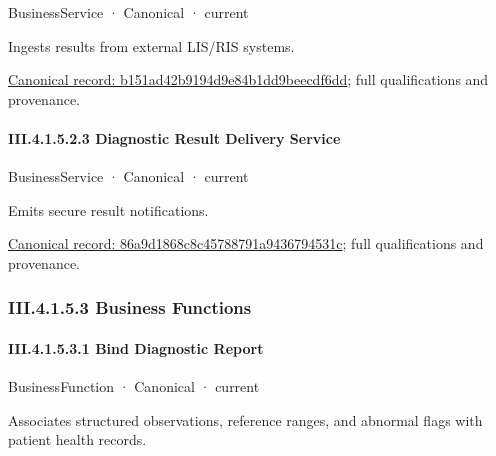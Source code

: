 \label{element:b151ad42b9194d9e84b1dd9beecdf6dd}
{\small BusinessService · Canonical · current}\par

Ingests results from external LIS/RIS systems.


{\footnotesize \href{../../../../continuum/business/business-service/b151ad42b9194d9e84b1dd9beecdf6dd.md}{Canonical record: b151ad42b9194d9e84b1dd9beecdf6dd}; full qualifications and provenance.}\par
\paragraph*{III.4.1.5.2.3 Diagnostic Result Delivery Service}
\label{navigation:III.4.1.5.2.3}

\label{element:86a9d1868c8c45788791a9436794531c}
{\small BusinessService · Canonical · current}\par

Emits secure result notifications.


{\footnotesize \href{../../../../continuum/business/business-service/86a9d1868c8c45788791a9436794531c.md}{Canonical record: 86a9d1868c8c45788791a9436794531c}; full qualifications and provenance.}\par
\subsubsection*{III.4.1.5.3 Business Functions}
\label{navigation:III.4.1.5.3}

\paragraph*{III.4.1.5.3.1 Bind Diagnostic Report}
\label{navigation:III.4.1.5.3.1}

\label{element:ee4bd6218f3a4029815bfc16912b88af}
{\small BusinessFunction · Canonical · current}\par

Associates structured observations, reference ranges, and abnormal flags with patient health records.


